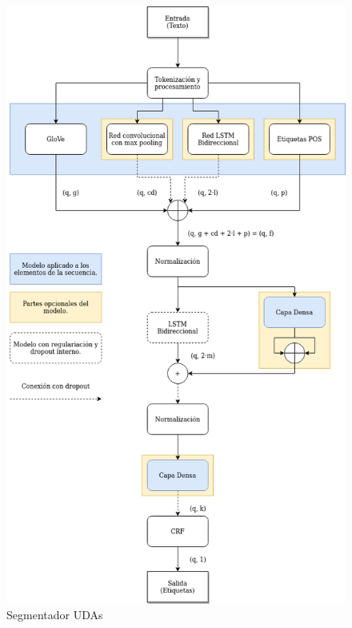 \begin{figure}[h!]
	\begin{center}
		\begin{center}
			\includegraphics[scale=.3]{Graphics/Modelo Segmenter UDA.drawio.png}
        \end{center}
	    \caption{Segmentador UDAs}\label{fig:seg_uda}
	\end{center}
\end{figure}

